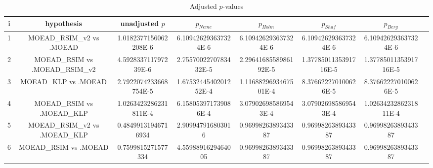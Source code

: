 \documentclass[a4paper,10pt]{article}
\begin{document}
\begin{landscape}
\begin{table}[!htp]
\centering\tiny
\caption{Adjusted $p$-values}
\begin{tabular}{cccccccc}
i&hypothesis&unadjusted $p$&$p_{Neme}$&$p_{Holm}$&$p_{Shaf}$&$p_{Berg}$\\
\hline
1&MOEAD_RSIM_v2 vs .MOEAD&1.0182377156062208E-6&6.109426293637324E-6&6.109426293637324E-6&6.109426293637324E-6&6.109426293637324E-6\\
2&MOEAD_RSIM vs .MOEAD_RSIM_v2&4.592833711797239E-6&2.7557002270783432E-5&2.2964168558986192E-5&1.3778501135391716E-5&1.3778501135391716E-5\\
3&MOEAD_KLP vs .MOEAD&2.7922074233668754E-5&1.6753244540201252E-4&1.1168829693467501E-4&8.376622270100626E-5&8.376622270100626E-5\\
4&MOEAD_RSIM vs .MOEAD_KLP&1.0263423286231811E-4&6.158053971739086E-4&3.079026985869543E-4&3.079026985869543E-4&1.0263423286231811E-4\\
5&MOEAD_RSIM_v2 vs .MOEAD_KLP&0.48499131946716934&2.909947916803016&0.9699826389343387&0.9699826389343387&0.9699826389343387\\
6&MOEAD_RSIM vs .MOEAD&0.7599815271577334&4.5598891629464005&0.9699826389343387&0.9699826389343387&0.9699826389343387\\
\hline
\end{tabular}
\end{table}

\end{landscape}
\end{document}
